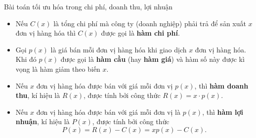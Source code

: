 \begin{dang}{Bài toán tối ưu hóa trong chi phí, doanh thu, lợi nhuận}
	\begin{itemize}
		\item [\iconCH] Nếu $C(x)$ là tổng chi phí mà công ty (doanh nghiệp) phải trả để sản xuất $x$ đơn vị hàng hóa thì $C(x)$ được gọi là \textbf{hàm chi phí}.
		\item [\iconCH] Gọi $p(x)$ là giá bán mỗi đơn vị hàng hóa khi giao dịch $x$ đơn vị hàng hóa. Khi đó $p(x)$ được gọi là \textbf{hàm cầu} (hay \textbf{hàm giá}) và hàm số này được kì vọng là hàm giảm theo biến $x$.
		\item [\iconCH] Nếu $x$ đơn vị hàng hóa được bán với giá mỗi đơn vị $p(x)$, thì \textbf{hàm doanh thu}, kí hiệu là $R(x)$, được tính bởi công thức $R(x)=x\cdot p(x)$.
		\item [\iconCH] Nếu $x$ đơn vị hàng hóa được bán với giá mỗi đơn vị là $p(x)$, thì \textbf{hàm lợi nhuận}, kí hiệu là $P(x)$, được tính bởi công thức \[P(x)=R(x)-C(x)=xp(x)-C(x).\]
	\end{itemize}
\end{dang}

